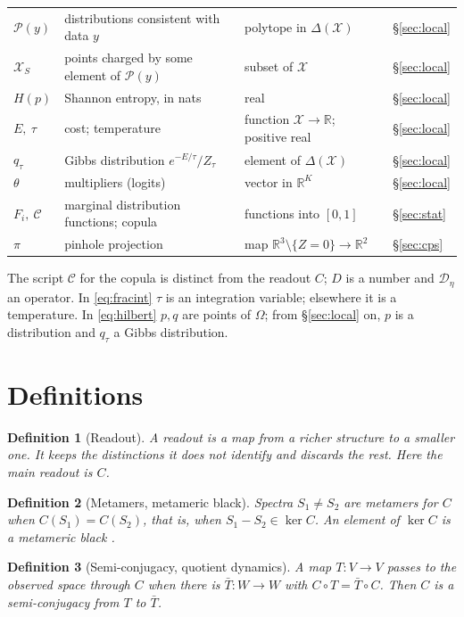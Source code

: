 \documentclass[11pt]{article}
\theoremstyle{boldplain}
\theoremstyle{boldupright}
\newtheorem{definition}{Definition}
\newcommand{\Dop}{\mathcal{D}}
\newcommand{\cop}{\mathcal{C}}
\newcommand{\Xs}{\mathcal{X}}
\newcommand{\Pc}{\mathcal{P}}
\begin{document}
{\begin{longtable}{@{}l p{2.7in} p{2.0in} l@{}}
$\Pc(y)$ & distributions consistent with data $y$ & polytope in $\Delta(\Xs)$ & \S\ref{sec:local}\\
$\Xs_S$ & points charged by some element of $\Pc(y)$ & subset of $\Xs$ & \S\ref{sec:local}\\
$H(p)$ & Shannon entropy, in nats & real & \S\ref{sec:local}\\
$E,\ \tau$ & cost; temperature & function $\Xs\to\mathbb{R}$; positive real & \S\ref{sec:local}\\
$q_\tau$ & Gibbs distribution $e^{-E/\tau}/Z_\tau$ & element of $\Delta(\Xs)$ & \S\ref{sec:local}\\
$\theta$ & multipliers (logits) & vector in $\mathbb{R}^K$ & \S\ref{sec:local}\\
$F_i,\ \cop$ & marginal distribution functions; copula & functions into $[0,1]$ & \S\ref{sec:stat}\\
$\pi$ & pinhole projection & map $\mathbb{R}^3\setminus\{Z=0\}\to\mathbb{R}^2$ & \S\ref{sec:cps}\\
\end{longtable}
}
\addtocounter{table}{-1}

\noindent The script $\cop$ for the copula is distinct from the readout $C$; $D$ is a number and $\Dop_\eta$ an operator.
In \eqref{eq:fracint} $\tau$ is an integration variable; elsewhere it is a temperature. In \eqref{eq:hilbert} $p,q$ are points
of $\Omega$; from \S\ref{sec:local} on, $p$ is a distribution and $q_\tau$ a Gibbs distribution.

\section*{Definitions}

\begin{definition}[Readout]
A readout is a map from a richer structure to a smaller one. It keeps the
distinctions it does not identify and discards the rest. Here the main readout is $C$.
\end{definition}

\begin{definition}[Metamers, metameric black]\label{def:metamer}
Spectra $S_1\neq S_2$ are metamers for $C$ when $C(S_1)=C(S_2)$, that is, when $S_1-S_2\in\ker C$.
An element of $\ker C$ is a metameric black \cite{wyszecki1958,cohen1982}.
\end{definition}

\begin{definition}[Semi-conjugacy, quotient dynamics]
A map $T:V\to V$ passes to the observed space
through $C$ when there is $\bar T:W\to W$ with $C\circ T=\bar T\circ C$. Then $C$ is a semi-conjugacy from $T$ to $\bar T$.
\end{definition}
\end{document}
